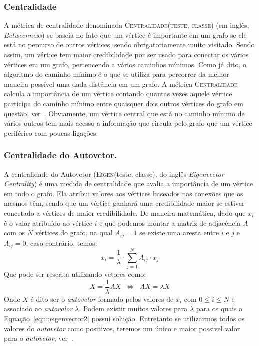 \subsubsection{Centralidade}
\label{subsubsection::constraint}
A métrica de centralidade denominada \textsc{Centralidade(teste, classe)} (em inglês, \textit{Betweenness}) se baseia no fato que um vértice é importante em um grafo se ele está no percurso de outros vértices, sendo obrigatoriamente muito visitado. Sendo assim, um vértice tem maior credibilidade por ser usado para conectar os vários vértices em um grafo, pertencendo a vários caminhos mínimos. Como já dito, o algoritmo do caminho mínimo é o que se utiliza para percorrer da melhor maneira possível uma dada distância em um grafo. A métrica \textsc{Centralidade} calcula a importância de um vértice contando quantas vezes aquele vértice participa do caminho mínimo entre quaisquer dois outros vértices do grafo em questão, ver~\cite{Sabidussi66}. Obviamente, um vértice central que está no caminho mínimo de vários outros tem mais acesso a informação que circula pelo grafo que um vértice periférico com poucas ligações.

\subsubsection{Centralidade do Autovetor.}
\label{subsubsection::eigenvector}

A centralidade do Autovetor (\textsc{Eigen}(teste, classe), do inglês \textit{Eigenvector Centrality}) é uma medida de centralidade que avalia a importância de um vértice em todo o grafo. Ela atribui valores aos vértices baseados nas conexões que os mesmos têm, sendo que um vértice ganhará uma credibilidade maior se estiver conectado a vértices de maior credibilidade. De maneira matemática, dado que $x_i$ é o valor atribuído ao vértice $i$ e que podemos montar a matriz de adjacência $A$ com os $N$ vértices do grafo, na qual $A_{ij} = 1$ se existe uma aresta entre $i$ e $j$ e $A_{ij}=0$, caso contrário, temos:
\begin{equation}\label{eqn::eigenvector1}
   x_i = \frac{1}{\lambda} \cdot \sum\limits_{j=1}^{N} A_{ij} \cdot x_j
\end{equation}
Que pode ser rescrita utilizando vetores como:
\begin{equation}\label{eqn::eigenvector2}
   X = \frac{1}{\lambda} AX  \;\; \Longleftrightarrow\;\;  AX = \lambda X
\end{equation}
Onde $X$ é dito ser o \textit{autovetor} formado pelos valores de $x_i$ com $0 \leq i \leq N$ e associado ao \textit{autovalor} $\lambda$.  Podem existir muitos valores para $\lambda$ para os quais a Equação~\ref{eqn::eigenvector2} possui solução. Entretanto se utilizarmos todos os valores do \textit{autovetor} como positivos, teremos um único e maior possivel valor para o \textit{autovetor}, ver~\cite{Newman10}. 

